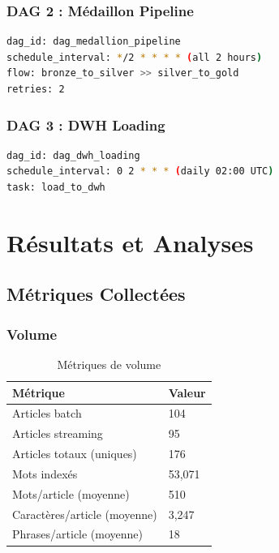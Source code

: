 \documentclass[12pt,a4paper]{report}
\begin{document}
\subsection{DAG 2 : Médaillon Pipeline}

\begin{lstlisting}[language=bash]
dag_id: dag_medallion_pipeline
schedule_interval: */2 * * * * (all 2 hours)
flow: bronze_to_silver >> silver_to_gold
retries: 2
\end{lstlisting}

\subsection{DAG 3 : DWH Loading}

\begin{lstlisting}[language=bash]
dag_id: dag_dwh_loading
schedule_interval: 0 2 * * * (daily 02:00 UTC)
task: load_to_dwh
\end{lstlisting}


\chapter{Résultats et Analyses}

\section{Métriques Collectées}

\subsection{Volume}

\begin{table}[H]
    \centering
    \begin{tabular}{ll}
        \toprule
        \textbf{Métrique}            & \textbf{Valeur} \\
        \midrule
        Articles batch               & 104             \\
        Articles streaming           & 95              \\
        Articles totaux (uniques)    & 176             \\
        Mots indexés                 & 53,071          \\
        Mots/article (moyenne)       & 510             \\
        Caractères/article (moyenne) & 3,247           \\
        Phrases/article (moyenne)    & 18              \\
        \bottomrule
    \end{tabular}
    \caption{Métriques de volume}
\end{table}
\end{document}
